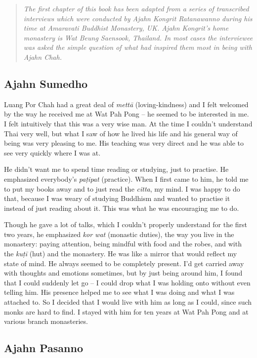 
\begin{quote}\itshape
The first chapter of this book has been adapted from a series of transcribed interviews which were conducted by Ajahn Kongrit Ratanawanno during his time at Amaravati Buddhist Monastery, UK. Ajahn Kongrit's home monastery is Wat Beung Saensook, Thailand. In most cases the interviewee was asked the simple question of what had inspired them most in being with Ajahn Chah.
\end{quote}

\subsection{Ajahn Sumedho}

Luang Por Chah had a great deal of \emph{mettā} (loving-kindness) and I
felt welcomed by the way he received me at Wat Pah Pong -- he seemed to
be interested in me. I felt intuitively that this was a very wise man. 
At the time I couldn't understand Thai very well, but what I saw of how
he lived his life and his general way of being was very pleasing to me. 
His teaching was very direct and he was able to see very quickly where I
was at. 

He didn't want me to spend time reading or studying, just to practise. 
He emphasized everybody's \emph{paṭipat} (practice). When I first came
to him, he told me to put my books away and to just read the
\emph{citta}, my mind. I was happy to do that, because I was weary of
studying Buddhism and wanted to practise it instead of just reading
about it. This was what he was encouraging me to do. 

Though he gave a lot of talks, which I couldn't properly understand for
the first two years, he emphasized \emph{kor wat} (monastic duties), the
way you live in the monastery: paying attention, being mindful with food
and the robes, and with the \emph{kuṭī} (hut) and the monastery. He was
like a mirror that would reflect my state of mind. He always seemed to
be completely present. I'd get carried away with thoughts and emotions
sometimes, but by just being around him, I found that I could suddenly
let go -- I could drop what I was holding onto without even telling him. 
His presence helped me to see what I was doing and what I was attached
to. So I decided that I would live with him as long as I could, since
such monks are hard to find. I stayed with him for ten years at Wat Pah
Pong and at various branch monasteries. 

\subsection{Ajahn Pasanno}

